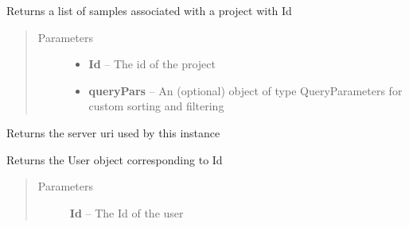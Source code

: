 \documentclass[letterpaper,10pt,english]{sphinxmanual}
\begin{document}
\begin{fulllineitems}
\begin{fulllineitems}
\begin{quote}
\begin{description}
\end{description}\end{quote}

\end{fulllineitems}


\begin{fulllineitems}
\label{Available modules:BaseSpacePy.api.BaseSpaceAPI.BaseSpaceAPI.getSamplesByProject}
Returns a list of samples associated with a project with Id
\begin{quote}\begin{description}
\item[{Parameters}] \leavevmode\begin{itemize}
\item {} 
\textbf{Id} -- The id of the project

\item {} 
\textbf{queryPars} -- An (optional) object of type QueryParameters for custom sorting and filtering

\end{itemize}

\end{description}\end{quote}

\end{fulllineitems}


\begin{fulllineitems}
\label{Available modules:BaseSpacePy.api.BaseSpaceAPI.BaseSpaceAPI.getServerUri}
Returns the server uri used by this instance

\end{fulllineitems}


\begin{fulllineitems}
\label{Available modules:BaseSpacePy.api.BaseSpaceAPI.BaseSpaceAPI.getUserById}
Returns the User object corresponding to Id
\begin{quote}\begin{description}
\item[{Parameters}] \leavevmode
\textbf{Id} -- The Id of the user


\end{description}
\end{quote}
\end{fulllineitems}
\end{fulllineitems}
\end{document}

